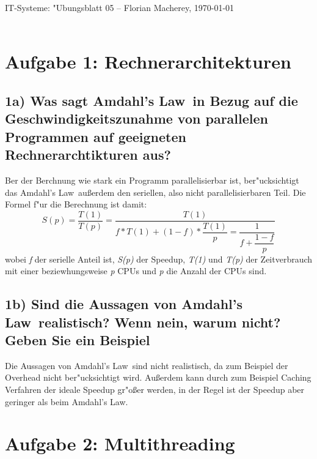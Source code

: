 \documentclass{article}
\begin{document}
{\Large \centering \textsf{IT-Systeme: "Ubungsblatt 05} -- Florian Macherey, 
\today}\\
\noindent\makebox[\linewidth]{\rule{\textwidth}{0.2pt}} \\


\section*{Aufgabe 1: Rechnerarchitekturen}
\subsection*{1a) Was sagt \dq Amdahl's Law\dq ~in Bezug auf die 
Geschwindigkeitszunahme von parallelen Programmen auf geeigneten 
Rechnerarchtikturen aus?}
Ber der Berchnung wie stark ein Programm parallelisierbar ist, ber"ucksichtigt das  
\dq Amdahl's Law\dq ~au\ss erdem den seriellen, also nicht parallelisierbaren 
Teil. Die Formel f"ur die Berechnung ist damit:
\[
 S(p) = \dfrac{T(1)}{T(p)} = \dfrac{T(1)}{f*T(1) + (1-f)*\dfrac{T(1)}{p} = 
 \dfrac{1}{f + 
 \dfrac{1-f}{p}} }
\]
wobei \textit{f} der serielle Anteil ist, \textit{S(p)} der Speedup, \textit{T(1)} und 
\textit{T(p)} der Zeitverbrauch mit einer beziewhungsweise \textit{p} CPUs und 
\textit{p} die Anzahl der CPUs sind.  

\subsection*{1b) Sind die Aussagen von \dq Amdahl's Law\dq ~realistisch? 
Wenn nein, warum nicht? Geben Sie ein Beispiel}
Die Aussagen von \dq Amdahl's Law\dq ~sind nicht realistisch, da zum Beispiel 
der Overhead nicht ber"ucksichtigt wird. Au\ss erdem kann durch zum Beispiel 
Caching Verfahren der ideale Speedup gr"o\ss er werden, in der Regel ist der 
Speedup aber geringer als beim \dq Amdahl's Law\dq.

\section*{Aufgabe 2: Multithreading}
\end{document}
